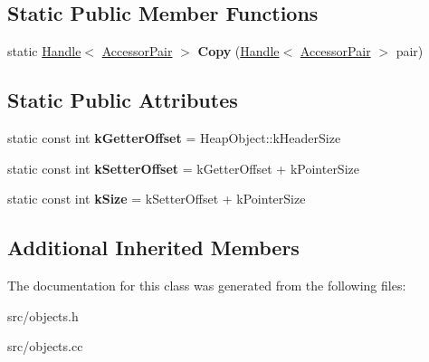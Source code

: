 \subsection*{Static Public Member Functions}
\begin{DoxyCompactItemize}
\item 
\hypertarget{classv8_1_1internal_1_1_accessor_pair_a9030ddc2b46863a79de840206d6c549c}{}static \hyperlink{classv8_1_1internal_1_1_handle}{Handle}$<$ \hyperlink{classv8_1_1internal_1_1_accessor_pair}{Accessor\+Pair} $>$ {\bfseries Copy} (\hyperlink{classv8_1_1internal_1_1_handle}{Handle}$<$ \hyperlink{classv8_1_1internal_1_1_accessor_pair}{Accessor\+Pair} $>$ pair)\label{classv8_1_1internal_1_1_accessor_pair_a9030ddc2b46863a79de840206d6c549c}

\end{DoxyCompactItemize}
\subsection*{Static Public Attributes}
\begin{DoxyCompactItemize}
\item 
\hypertarget{classv8_1_1internal_1_1_accessor_pair_aa7ee07b7098a35f0e1340c33dadb90db}{}static const int {\bfseries k\+Getter\+Offset} = Heap\+Object\+::k\+Header\+Size\label{classv8_1_1internal_1_1_accessor_pair_aa7ee07b7098a35f0e1340c33dadb90db}

\item 
\hypertarget{classv8_1_1internal_1_1_accessor_pair_adaca2d4fb0dfcf2e29fd37fc5549737b}{}static const int {\bfseries k\+Setter\+Offset} = k\+Getter\+Offset + k\+Pointer\+Size\label{classv8_1_1internal_1_1_accessor_pair_adaca2d4fb0dfcf2e29fd37fc5549737b}

\item 
\hypertarget{classv8_1_1internal_1_1_accessor_pair_a89c0268865b5203f29820f82b5e46cb5}{}static const int {\bfseries k\+Size} = k\+Setter\+Offset + k\+Pointer\+Size\label{classv8_1_1internal_1_1_accessor_pair_a89c0268865b5203f29820f82b5e46cb5}

\end{DoxyCompactItemize}
\subsection*{Additional Inherited Members}


The documentation for this class was generated from the following files\+:\begin{DoxyCompactItemize}
\item 
src/objects.\+h\item 
src/objects.\+cc\end{DoxyCompactItemize}
